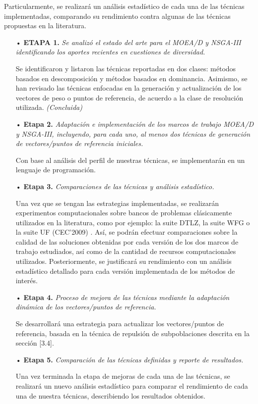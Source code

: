 \documentclass[letterpaper,10pt]{article}
\begin{document}
Particularmente, se realizará un análisis estadístico de cada una de las técnicas implementadas, comparando su rendimiento contra algunas de las  técnicas propuestas en la literatura.
 
 \begin{itemize}
 \item[•] \textbf{ETAPA 1.} \emph{Se analizó el estado del arte para el MOEA/D y NSGA-III identificando los aportes recientes en cuestiones de diversidad.}
\item[] Se identificaron y listaron las técnicas reportadas en dos clases: métodos basados en descomposición y métodos basados en dominancia. Asimismo, se han revisado las técnicas enfocadas en la generación y actualización de los vectores de peso o puntos de referencia, de acuerdo a la clase de resolución utilizada.
\emph{(Concluida)}

\item[•] \textbf{Etapa 2.} \emph{Adaptación e implementación de los marcos de trabajo MOEA/D y NSGA-III, incluyendo, para cada uno, al menos dos técnicas de generación de vectores/puntos de referencia iniciales.}

\item[] Con base al análisis del perfil de nuestras técnicas, se implementarán en un lenguaje de programación.
        
\item[•] \textbf{Etapa 3.} \emph{Comparaciones de las técnicas y análisis estadístico.}

\item [] Una vez que se tengan las estrategias implementadas, se realizarán experimentos computacionales sobre bancos de problemas clásicamente utilizados en la literatura, como por ejemplo: la suite DTLZ, la suite WFG o la suite UF (CEC'2009) \cite{coello2007evolutionary,zhang2008multiobjective}. Así, se podrán efectuar comparaciones sobre la calidad de las soluciones obtenidas por cada versión de los dos marcos de trabajo estudiados, así como de la cantidad de recursos computacionales utilizados. Posteriormente, se justificará su rendimiento con un análisis estadístico detallado para cada versión implementada de los métodos de interés.

\item[•] \textbf{Etapa 4.} \emph{Proceso de mejora de las técnicas mediante la adaptación dinámica de los vectores/puntos de referencia.}

\item[] Se desarrollará una estrategia para actualizar los vectores/puntos de referencia, basada en la técnica de repulsión de subpoblaciones descrita en la sección [3.4].

\item[•] \textbf{Etapa 5.} \emph{Comparación de las técnicas definidas y reporte de resultados.}

\item[] Una vez terminada la etapa de mejoras de cada una de las técnicas, se realizará un nuevo análisis estadístico para comparar el rendimiento de cada una de nuestra técnicas, describiendo los resultados obtenidos.
        
\end{itemize}
\end{document}
